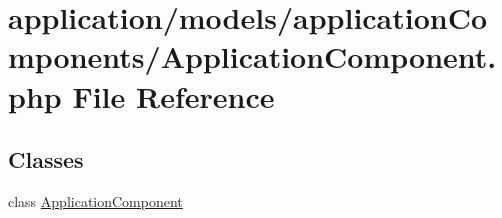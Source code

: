 \hypertarget{_application_component_8php}{\section{application/models/application\-Components/\-Application\-Component.php File Reference}
\label{_application_component_8php}
}
\subsection*{Classes}
\begin{DoxyCompactItemize}
\item 
class \hyperlink{class_application_component}{Application\-Component}
\end{DoxyCompactItemize}
